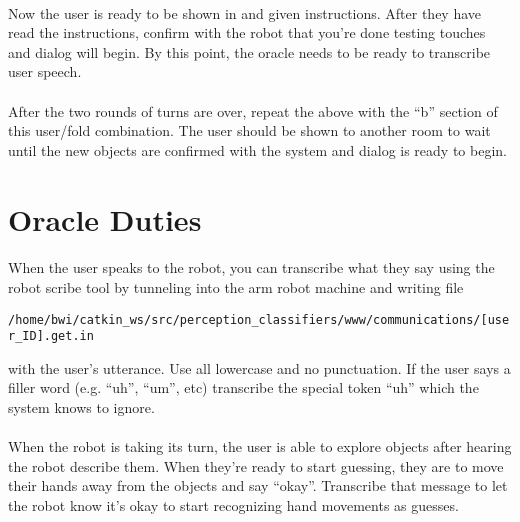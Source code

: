 \documentclass{article}
\begin{document}
\paragraph{} Now the user is ready to be shown in and given instructions. After they have read the instructions, confirm with the robot that you're done testing touches and dialog will begin. By this point, the oracle needs to be ready to transcribe user speech.

\paragraph{} After the two rounds of turns are over, repeat the above with the ``b'' section of this user/fold combination. The user should be shown to another room to wait until the new objects are confirmed with the system and dialog is ready to begin.

\section{Oracle Duties}

\paragraph{} When the user speaks to the robot, you can transcribe what they say using the robot scribe tool by tunneling into the arm robot machine and writing file

\texttt{/home/bwi/catkin\_ws/src/perception\_classifiers/www/communications/[user\_ID].get.in} 

with the user's utterance. Use all lowercase and no punctuation. If the user says a filler word (e.g. ``uh'', ``um'', etc) transcribe the special token ``uh'' which the system knows to ignore.

\paragraph{} When the robot is taking its turn, the user is able to explore objects after hearing the robot describe them. When they're ready to start guessing, they are to move their hands away from the objects and say ``okay''. Transcribe that message to let the robot know it's okay to start recognizing hand movements as guesses.
\end{document}
